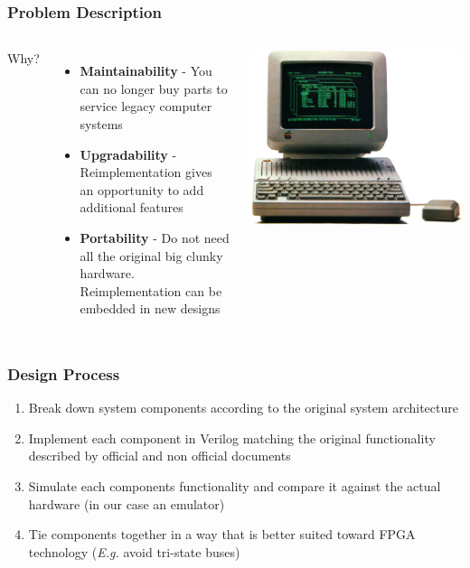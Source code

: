 \documentclass[xcolor=table]{beamer}
\newlength{\wideitemsep}
\let\olditem\item
\renewcommand{\item}{\setlength{\itemsep}{\wideitemsep}\olditem}
\begin{document}
\begin{frame}
    \frametitle{Problem Description}

    \begin{columns}[c]
            Why?
            \begin{itemize}
                \item<2-> \textbf{Maintainability} - You can no longer buy parts to service legacy computer systems
                \item<3-> \textbf{Upgradability} - Reimplementation gives an opportunity to add additional features
                \item<4-> \textbf{Portability} - Do not need all the original big clunky hardware. Reimplementation can
                    be embedded in new designs
            \end{itemize}

            \includegraphics[width=\textwidth]{../images/apple_2.jpg}
    \end{columns}
\end{frame}

\begin{frame}
    \frametitle{Design Process}
    \begin{enumerate}
        \item<1-> Break down system components according to the original system architecture
        \item<2-> Implement each component in Verilog matching the original
            functionality described by official and non official documents
        \item<3-> Simulate each components functionality and compare it against the actual hardware (in our case an emulator)
        \item<4-> Tie components together in a way that is better suited toward FPGA technology (\emph{E.g.} avoid tri-state buses)
    \end{enumerate}
\end{frame}
\end{document}
